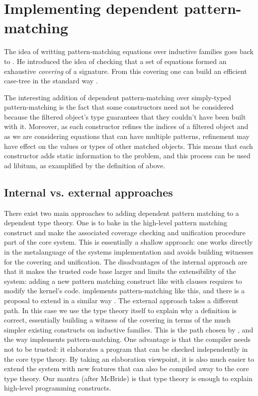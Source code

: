 \section{Implementing dependent pattern-matching}

The idea of writting pattern-matching equations over inductive families
goes back to \cite{coquand92baastad}. He introduced the idea of checking
that a set of equations formed an exhaustive \emph{covering} of a
signature. From this covering one can build an efficient case-tree in
the standard way \cite{DBLP:conf/fpca/Augustsson85}.

The interesting addition of dependent pattern-matching over simply-typed
pattern-matching is the fact that some constructors need not be
considered because the filtered object's type guarantees that they
couldn't have been built with it. Moreover, as each constructor refines
the indices of a filtered object and as we are considering equations
that can have multiple patterns, refinement may have effect on the
values or types of other matched objects. This means that each
constructor adds static information to the problem, and this process 
can be used ad libitum, as examplified by the definition of
 above. 

\subsection{Internal vs. external approaches}

There exist two main approaches to adding dependent pattern matching to
a dependent type theory. One is to bake in the high-level pattern
matching construct and make the associated coverage checking and 
unification procedure part of the core system. This is essentially a
shallow approach: one works directly in the metalanguage of the 
systems implementation and avoids building witnesses for the covering
and unification. The disadvantages of the internal approach are that
it makes the trusted code base larger and limits the extensibility of 
the system: adding a new pattern matching construct like with clauses 
requires to modify the kernel's code. \Agda implements pattern-matching
like this, and there is a proposal to extend \Coq in a similar way
\cite{CoqTYPES09}. 
The external approach takes a different path. In this case we use the 
type theory itself to explain why a definition is correct,
essentially building a witness of the covering in terms of the much
simpler existing constructs on inductive families. This is the path 
chosen by \cite{DBLP:conf/birthday/GoguenMM06}, and the way \Epigram
implements pattern-matching. One advantage is that the compiler needs
not to be trusted: it elaborates a program that can be checked
independently in the core type theory. By taking an elaboration
viewpoint, it is also much easier to extend the system with new features
that can also be compiled away to the core type theory. Our 
mantra (after McBride) is that type theory is enough to explain
high-level programming constructs. 

